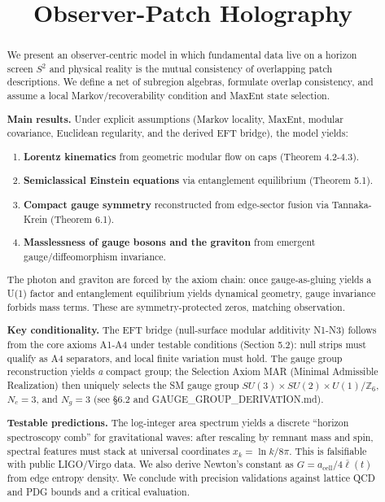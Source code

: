 \documentclass[11pt,a4paper]{article}
\title{Observer-Patch Holography}
\date{}
\theoremstyle{remark}
\providecommand{\tightlist}{%
  \setlength{\itemsep}{0pt}\setlength{\parskip}{0pt}}
\begin{document}
\maketitle

\begin{abstract}
We present an observer-centric model in which fundamental data live on a
horizon screen \(S^2\) and physical reality is the mutual consistency of
overlapping patch descriptions. We define a net of subregion algebras,
formulate overlap consistency, and assume a local Markov/recoverability
condition and MaxEnt state selection.

\textbf{Main results.} Under explicit assumptions (Markov locality, MaxEnt, modular
covariance, Euclidean regularity, and the derived EFT bridge), the model yields:

\begin{enumerate}
\def\labelenumi{\arabic{enumi}.}
\tightlist
\item
  \textbf{Lorentz kinematics} from geometric modular flow on caps (Theorem 4.2-4.3).
\item
  \textbf{Semiclassical Einstein equations} via entanglement equilibrium (Theorem 5.1).
\item
  \textbf{Compact gauge symmetry} reconstructed from edge-sector fusion via
  Tannaka-Krein (Theorem 6.1).
\item
  \textbf{Masslessness of gauge bosons and the graviton} from emergent
  gauge/diffeomorphism invariance.
\end{enumerate}

The photon and graviton are forced by the axiom chain: once gauge-as-gluing
yields a U(1) factor and entanglement equilibrium yields dynamical geometry,
gauge invariance forbids mass terms. These are symmetry-protected zeros,
matching observation.

\textbf{Key conditionality.} The EFT bridge (null-surface modular additivity N1-N3)
follows from the core axioms A1-A4 under testable conditions (Section
5.2): null strips must qualify as A4 separators, and local finite variation
must hold. The gauge group reconstruction yields \emph{a} compact group; the
Selection Axiom MAR (Minimal Admissible Realization) then uniquely selects
the SM gauge group \(SU(3) \times SU(2) \times U(1)/\mathbb{Z}_6\), \(N_c = 3\),
and \(N_g = 3\) (see §6.2 and GAUGE\_GROUP\_DERIVATION.md).

\textbf{Testable predictions.} The log-integer area spectrum yields a discrete
``horizon spectroscopy comb'' for gravitational waves: after rescaling by
remnant mass and spin, spectral features must stack at universal coordinates
\(x_k = \ln k / 8\pi\). This is falsifiable with public LIGO/Virgo data. We
also derive Newton's constant as \(G = a_\mathrm{cell}/4\bar{\ell}(t)\) from edge
entropy density. We conclude with precision
validations against lattice QCD and PDG bounds and a critical evaluation.


\end{abstract}
\end{document}
